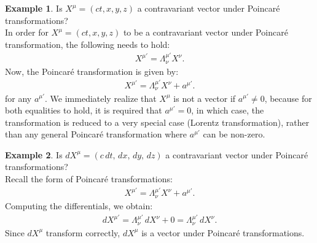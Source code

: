 \documentclass{article}
\theoremstyle{definition}
\newtheorem{exmp}{Example}[section]
\begin{document}
\begin{exmp}
	Is $X^\mu = (ct,x,y,z)$ a contravariant vector under Poincar\'e transformations?\\
	
	In order for $X^\mu = (ct,x,y,z)$ to be a contravariant vector under Poincar\'e transformation, the following needs to hold:
	\begin{align*}
	X^{\mu'} = \Lambda^{\mu'}_\nu X^\nu.
	\end{align*}
	Now, the Poincar\'e transformation is given by:
	\begin{align*}
	X^{\mu'} = \Lambda^{\mu'}_\nu X^\nu + a^{\mu'}.
	\end{align*}
	for any $a^{\mu'}$. We immediately realize that $X^\mu$ is not a vector if $a^{\mu'} \neq 0$, because for both equalities to hold, it is required that $a^{\mu'} = 0$, in which case, the transformation is reduced to a very special case (Lorentz transformation), rather than any general Poincar\'e transformation where $a^{\mu'}$ can be non-zero.  	\\
\end{exmp}

\begin{exmp}
	Is $dX^\mu = (c\,dt, \,dx, \,dy, \,dz)$ a contravariant vector under Poincar\'e transformations?\\
	
	Recall the form of Poincar\'e transformations:
	\begin{align*}
	X^{\mu'} = \Lambda^{\mu'}_\nu X^\nu + a^{\mu'}.
	\end{align*}
	Computing the differentials, we obtain:
	\begin{align*}
	dX^{\mu'} = \Lambda^{\mu'}_\nu\,dX^\nu + 0 = \Lambda^{\mu'}_\nu\,dX^\nu.
	\end{align*}
	Since $dX^{\mu}$ transform correctly, $dX^\mu$ is a vector under Poincar\'e transformations. \\
\end{exmp}
\end{document}
